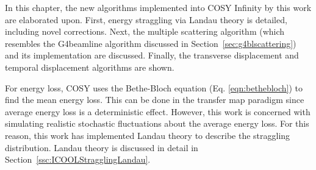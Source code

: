 In this chapter, the new algorithms implemented into COSY Infinity by this work are elaborated upon. First, energy straggling via Landau theory is detailed, including novel corrections. Next, the multiple scattering algorithm (which resembles the G4beamline algorithm discussed in Section~\ref{sec:g4blscattering}) and its implementation are discussed. Finally, the transverse displacement and temporal displacement algorithms are shown.

 \label{sec:COSYStraggling}\par
For energy loss, COSY uses the Bethe-Bloch equation (Eq. \eqref{eqn:bethebloch}) to find the mean energy loss. This can be done in the transfer map paradigm since average energy loss is a deterministic effect. However, this work is concerned with simulating realistic stochastic fluctuations about the average energy loss. For this reason, this work has implemented Landau theory \cite{landau} to describe the straggling distribution. Landau theory is discussed in detail in Section~\ref{ssc:ICOOLStragglingLandau}. 

